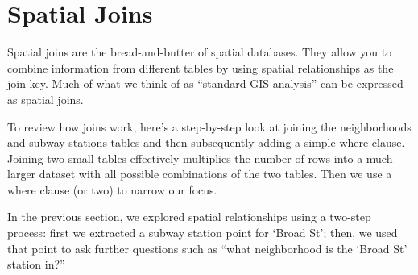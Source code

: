 \documentclass[a4paper,11pt,english]{sphinxmanual}
\begin{document}
\section{Spatial Joins}
\label{\detokenize{basic:spatial-joins}}\label{\detokenize{basic:joins}}
Spatial joins are the bread-and-butter of spatial databases.  They allow you to combine information from different tables by using spatial relationships as the join key.  Much of what we think of as “standard GIS analysis” can be expressed as spatial joins.

To review how joins work, here’s a step-by-step look at joining the neighborhoods and subway stations tables and then subsequently adding a simple where clause.  Joining two small tables effectively multiplies the number of rows into a much larger dataset with all possible combinations of the two tables.  Then we use a where clause (or two) to narrow our focus.

\begin{sphinxVerbatim}[commandchars=\\\{\}]
    

    

  
        
      

  
        
      
    
\end{sphinxVerbatim}

In the previous section, we explored spatial relationships using a two-step process: first we extracted a subway station point for ‘Broad St’; then, we used that point to ask further questions such as “what neighborhood is the ‘Broad St’ station in?”
\end{document}
